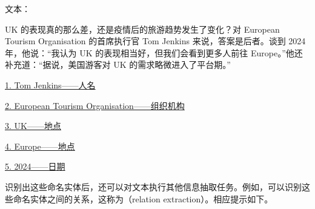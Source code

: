 \vspace{0.5em}
\begin{tcolorbox}

\begingroup
\setlength{\leftskip}{2em}
\setlength{\rightskip}{2em}


\vspace{0.7em}

文本：

UK 的表现真的那么差，还是疫情后的旅游趋势发生了变化？对 European Tourism Organisation 的首席执行官 Tom Jenkins 来说，答案是后者。谈到 2024 年，他说：“我认为 UK 的表现相当好，但我们会看到更多人前往 Europe。”他还补充道：“据说，美国游客对 UK 的需求略微进入了平台期。”

\vspace{0.7em}

\underline{1. Tom Jenkins——人名}

\vspace{0.3em}

\underline{2. European Tourism Organisation——组织机构}

\vspace{0.3em}

\underline{3. UK——地点}

\vspace{0.3em}

\underline{4. Europe——地点}

\vspace{0.3em}

\underline{5. 2024——日期}

\endgroup

\end{tcolorbox}
\vspace{0.5em}

识别出这些命名实体后，还可以对文本执行其他信息抽取任务。例如，可以识别这些命名实体之间的关系，这称为（relation extraction）。相应提示如下。

